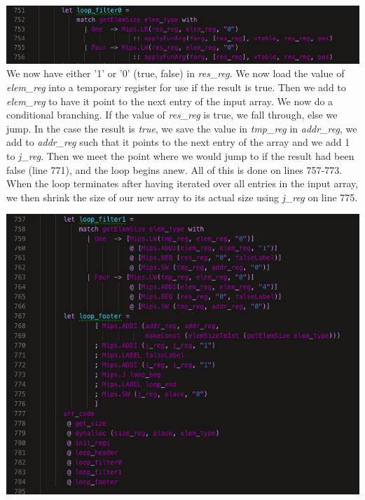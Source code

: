 \includegraphics[width=\linewidth]{Materials/CodeGen/filter1}
We now have either '1' or '0' (true, false) in \textit{res\_reg}. We now load the value of \textit{elem\_reg} into a temporary register for use if the result is true. Then we add to \textit{elem\_reg} to have it point to the next entry of the input array. We now do a conditional branching. If the value of \textit{res\_reg} is true, we fall through, else we jump. In the case the result is \textit{true}, we save the value in \textit{tmp\_reg} in \textit{addr\_reg}, we add to \textit{addr\_reg} such that it points to the next entry of the array and we add 1 to \textit{j\_reg}. Then we meet the point where we would jump to if the result had been false (line 771), and the loop begins anew. All of this is done on lines 757-773. When the loop terminates after having iterated over all entries in the input array, we then shrink the size of our new array to its actual size using \textit{j\_reg} on line 775.

\includegraphics[width=\linewidth]{Materials/CodeGen/filter2}